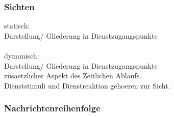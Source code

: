 \documentclass{article}
\newcommand{\tab}{\null \qquad}
\begin{document}
\subsubsection{Sichten}
statisch:\\
\tab Darstellung/ Gliederung in Dienstzugangspunkte\\
\\
dynamisch:\\
\tab Darstellung/ Gliederung in Dienstzugangspunkte\\
\tab zusaetzlicher Aspekt des Zeitlichen Ablaufs.\\
\tab \tab Dienststimuli und Dienstreaktion gehoeren zur Sicht.\\
\subsubsection{Nachrichtenreihenfolge}
\end{document}
